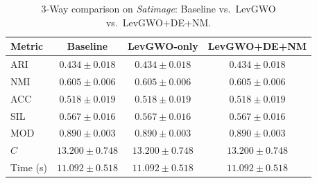 \begin{table}[htbp]
\centering
\caption{3-Way comparison on \textit{Satimage}: Baseline vs.\ LevGWO vs.\ LevGWO+DE+NM.}
\label{tab:satimage_3way}
\begin{tabular}{lccc}
\toprule
Metric & Baseline & LevGWO-only & LevGWO+DE+NM \\
\midrule
ARI & $\mathbf{0.434 \pm 0.018}$ & $\mathbf{0.434 \pm 0.018}$ & $\mathbf{0.434 \pm 0.018}$ \\
NMI & $\mathbf{0.605 \pm 0.006}$ & $\mathbf{0.605 \pm 0.006}$ & $\mathbf{0.605 \pm 0.006}$ \\
ACC & $\mathbf{0.518 \pm 0.019}$ & $\mathbf{0.518 \pm 0.019}$ & $\mathbf{0.518 \pm 0.019}$ \\
SIL & $\mathbf{0.567 \pm 0.016}$ & $\mathbf{0.567 \pm 0.016}$ & $\mathbf{0.567 \pm 0.016}$ \\
MOD & $\mathbf{0.890 \pm 0.003}$ & $\mathbf{0.890 \pm 0.003}$ & $\mathbf{0.890 \pm 0.003}$ \\
$C$ & $13.200 \pm 0.748$ & $13.200 \pm 0.748$ & $13.200 \pm 0.748$ \\
Time (s) & $11.092 \pm 0.518$ & $11.092 \pm 0.518$ & $11.092 \pm 0.518$ \\
\bottomrule
\end{tabular}
\end{table}